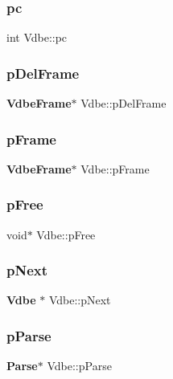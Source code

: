 \mbox{\label{struct_vdbe_ae25264a36877487fb58814608a46689c}} 
\subsubsection{pc}
{\footnotesize\ttfamily int Vdbe\+::pc}

\mbox{\label{struct_vdbe_ab8f22136c8bdb4c02962a1ae081e9116}} 
\subsubsection{pDelFrame}
{\footnotesize\ttfamily \textbf{ Vdbe\+Frame}$\ast$ Vdbe\+::p\+Del\+Frame}

\mbox{\label{struct_vdbe_afd754aaedd6cd5b229fbeff33177fe04}} 
\subsubsection{pFrame}
{\footnotesize\ttfamily \textbf{ Vdbe\+Frame}$\ast$ Vdbe\+::p\+Frame}

\mbox{\label{struct_vdbe_a68dcaae5d4f061da3d7bb96c120fe9a4}} 
\subsubsection{pFree}
{\footnotesize\ttfamily void$\ast$ Vdbe\+::p\+Free}

\mbox{\label{struct_vdbe_a9d52c1a2d64f132c6994eeac00063df9}} 
\subsubsection{pNext}
{\footnotesize\ttfamily \textbf{ Vdbe} $\ast$ Vdbe\+::p\+Next}

\mbox{\label{struct_vdbe_a90fc4cdcc206a8f62c18e860b78f5cda}} 
\subsubsection{pParse}
{\footnotesize\ttfamily \textbf{ Parse}$\ast$ Vdbe\+::p\+Parse}

\mbox{\label{struct_vdbe_a2afc3b6cd2f5b38d991148b809b3c53f}} 
